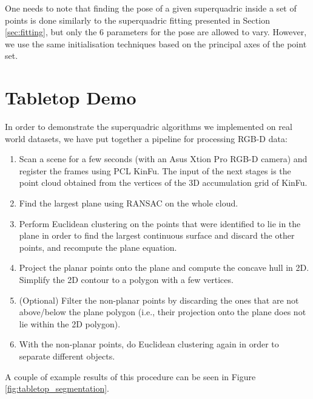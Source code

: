 \documentclass{article}
\begin{document}
One needs to note that finding the pose of a given superquadric inside a set of points is done similarly to the superquadric fitting presented in Section \ref{sec:fitting}, but only the 6 parameters for the pose are allowed to vary. However, we use the same initialisation techniques based on the principal axes of the point set.

\section {Tabletop Demo}
\label{sec:tabletop_demo} 

In order to demonstrate the superquadric algorithms we implemented on real world datasets, we have put together a pipeline for processing RGB-D data:

\begin{enumerate}
\item {Scan a scene for a few seconds (with an Asus Xtion Pro RGB-D camera) and register the frames using PCL KinFu. The input of the next stages is the point cloud obtained from the vertices of the 3D accumulation grid of KinFu.}
\item {Find the largest plane using RANSAC on the whole cloud.}
\item {Perform Euclidean clustering on the points that were identified to lie in the plane in order to find the largest continuous surface and discard the other points, and recompute the plane equation.}
\item {Project the planar points onto the plane and compute the concave hull in 2D. Simplify the 2D contour to a polygon with a few vertices.}
\item {(Optional) Filter the non-planar points by discarding the ones that are not above/below the plane polygon (i.e., their projection onto the plane does not lie within the 2D polygon).}
\item {With the non-planar points, do Euclidean clustering again in order to separate different objects.}
\end{enumerate}

A couple of example results of this procedure can be seen in Figure \ref{fig:tabletop_segmentation}.
\end{document}

